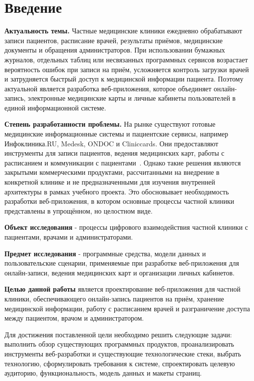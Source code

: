 
\section*{Введение}

\textbf{Актуальность темы.} Частные медицинские клиники ежедневно обрабатывают записи пациентов, расписание врачей, результаты приёмов, медицинские документы и обращения администраторов. При использовании бумажных журналов, отдельных таблиц или несвязанных программных сервисов возрастает вероятность ошибок при записи на приём, усложняется контроль загрузки врачей и затрудняется быстрый доступ к медицинской информации пациента. Поэтому актуальной является разработка веб-приложения, которое объединяет онлайн-запись, электронные медицинские карты и личные кабинеты пользователей в единой информационной системе.

\textbf{Степень разработанности проблемы.} На рынке существуют готовые медицинские информационные системы и пациентские сервисы, например Инфоклиника.RU, Medesk, ONDOC и Cliniccards. Они предоставляют инструменты для записи пациентов, ведения медицинских карт, работы с расписанием и коммуникации с пациентами~\cite{infoclinica,medesk,ondoc,cliniccards}. Однако такие решения являются закрытыми коммерческими продуктами, рассчитанными на внедрение в конкретной клинике и не предназначенными для изучения внутренней архитектуры в рамках учебного проекта. Это обосновывает необходимость разработки веб-приложения, в котором основные процессы частной клиники представлены в упрощённом, но целостном виде.

\textbf{Объект исследования} - процессы цифрового взаимодействия частной клиники с пациентами, врачами и администраторами.

\textbf{Предмет исследования} - программные средства, модели данных и пользовательские сценарии, применяемые при разработке веб-приложения для онлайн-записи, ведения медицинских карт и организации личных кабинетов.

\textbf{Целью данной работы} является проектирование веб-приложения для частной клиники, обеспечивающего онлайн-запись пациентов на приём, хранение медицинской информации, работу с расписанием врачей и разграничение доступа между пациентом, врачом и администратором.

Для достижения поставленной цели необходимо решить следующие задачи: выполнить обзор существующих программных продуктов, проанализировать инструменты веб-разработки и существующие технологические стеки, выбрать технологию, сформулировать требования к системе, спроектировать целевую аудиторию, функциональность, модель данных и макеты страниц.
